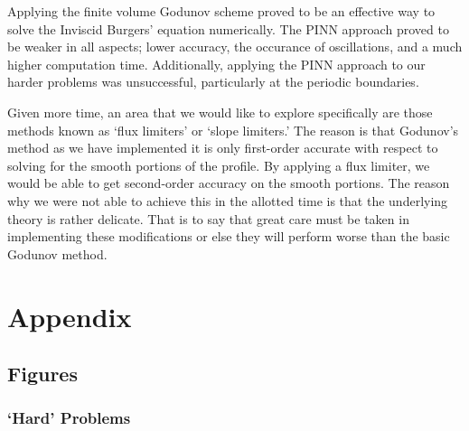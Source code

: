 \documentclass{myproject}
\begin{document}
Applying the finite volume Godunov scheme proved to be an effective way to solve the Inviscid Burgers' equation numerically. The PINN approach proved to be weaker in all aspects; lower accuracy, the occurance of oscillations, and a much higher computation time. Additionally, applying the PINN approach to our harder problems was unsuccessful, particularly at the periodic boundaries.

Given more time, an area that we would like to explore specifically are those methods known as `flux limiters' or `slope limiters.' The reason is that Godunov's method as we have implemented it is only first-order accurate with respect to solving for the smooth portions of the profile. By applying a flux limiter, we would be able to get second-order accuracy on the smooth portions. The reason why we were not able to achieve this in the allotted time is that the underlying theory is rather delicate. That is to say that great care must be taken in implementing these modifications or else they will perform worse than the basic Godunov method.

\newpage
\appendix
\section{Appendix}
\subsection{Figures}

\subsubsection{`Hard' Problems}
\end{document}
